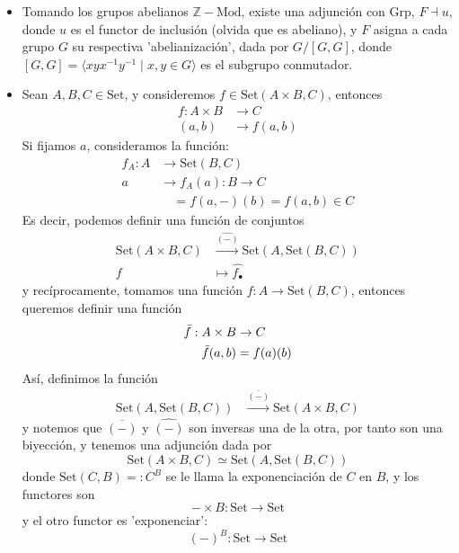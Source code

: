 \documentclass[12pt,letterpaper,titlepage]{article}
\theoremstyle{definition}
\newcommand\ol[1]{\overline{#1}}
\newcommand\Z{\mathbb Z}
\newcommand{\Grp}{\mathrm{Grp}}
\newcommand\rar[1]{\xrightarrow{#1}}
\newcommand\<{\langle}
\renewcommand\>{\rangle}
\newcommand{\Con}{\mathrm{Set}}
\begin{document}
\begin{itemize}
    \item
    Tomando los grupos abelianos $\Z-\mathrm{Mod}$, existe una adjunción con $\Grp$, $F\dashv u$, donde $u$ es el functor de inclusión (olvida que es abeliano), y $F$ asigna a cada grupo $G$ su respectiva 'abelianización', dada por $G/[G,G]$,
    donde $[G,G]=\langle xyx^{-1}y^{-1}\mid x,y\in G\rangle$
    es el subgrupo conmutador.
    \item Sean $A,B,C\in\Con$, y consideremos $f\in\Con(A\times B, C)$, entonces
    \begin{align*}
        f: A\times B & \to C \\
        (a,b) & \to f(a,b)
    \end{align*}
    Si fijamos $a$, consideramos la función:
    \begin{align*}
        f_A: A & \to \Con(B,C)\\
        a & \to f_A(a): B\to C \\
        &\quad = f(a,-)(b)=f(a,b)\in C
    \end{align*}
    Es decir, podemos definir una función de conjuntos
    \begin{align*}
        \Con(A\times B, C) & \rar{\widehat{(-)}} \Con(A,\Con(B,C)) \\
        f&\mapsto \hat{f_{\bullet}}
    \end{align*}
    y recíprocamente, tomamos una función $f:A\to\Con(B,C)$, entonces queremos definir una función
    \begin{align*}
        \Bar{f}:A\times B & \to C \\
        \Bar{f}(a,b) &= f(a)(b)
    \end{align*}
    Así, definimos la función 
    \begin{align*}
        \Con(A,\Con(B,C))
        & \rar{\ol{(-)}}
        \Con(A\times B, C)
    \end{align*}
    y notemos que $\ol{(-)}$ y $\widehat{(-)}$ son inversas una de la otra, por tanto son una biyección, y tenemos una adjunción dada por
    \begin{equation*}
        \Con(A\times B, C)\simeq\Con(A,\Con(B,C))
    \end{equation*}
    donde $\Con(C,B)=:C^B$ se le llama la exponenciación de $C$ en $B$, y los functores son
    \begin{equation*}
        {-}\times B:\Con\to \Con
    \end{equation*}
    y el otro functor es 'exponenciar':
    \begin{equation*}
        ({-})^B:\Con\to \Con
    \end{equation*}
    

\end{itemize}
\end{document}
